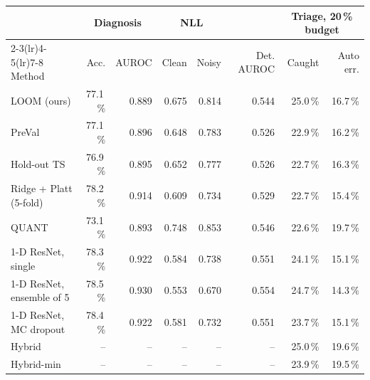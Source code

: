 \begin{tabular}{lrrrrrrr}
\toprule
& \multicolumn{2}{c}{Diagnosis} & \multicolumn{2}{c}{NLL} & & \multicolumn{2}{c}{Triage, 20\,\% budget} \\ \cmidrule(lr){2-3}\cmidrule(lr){4-5}\cmidrule(lr){7-8}
Method & Acc. & AUROC & Clean & Noisy & Det. AUROC & Caught & Auto err. \\
\midrule
LOOM (ours) & 77.1\,\% & 0.889 & 0.675 & 0.814 & 0.544 & 25.0\,\% & 16.7\,\% \\
PreVal & 77.1\,\% & 0.896 & 0.648 & 0.783 & 0.526 & 22.9\,\% & 16.2\,\% \\
Hold-out TS & 76.9\,\% & 0.895 & 0.652 & 0.777 & 0.526 & 22.7\,\% & 16.3\,\% \\
Ridge + Platt (5-fold) & 78.2\,\% & 0.914 & 0.609 & 0.734 & 0.529 & 22.7\,\% & 15.4\,\% \\
QUANT & 73.1\,\% & 0.893 & 0.748 & 0.853 & 0.546 & 22.6\,\% & 19.7\,\% \\
1-D ResNet, single & 78.3\,\% & 0.922 & 0.584 & 0.738 & 0.551 & 24.1\,\% & 15.1\,\% \\
1-D ResNet, ensemble of 5 & 78.5\,\% & 0.930 & 0.553 & 0.670 & 0.554 & 24.7\,\% & 14.3\,\% \\
1-D ResNet, MC dropout & 78.4\,\% & 0.922 & 0.581 & 0.732 & 0.551 & 23.7\,\% & 15.1\,\% \\
Hybrid & -- & -- & -- & -- & -- & 25.0\,\% & 19.6\,\% \\
Hybrid-min & -- & -- & -- & -- & -- & 23.9\,\% & 19.5\,\% \\
\bottomrule
\end{tabular}
